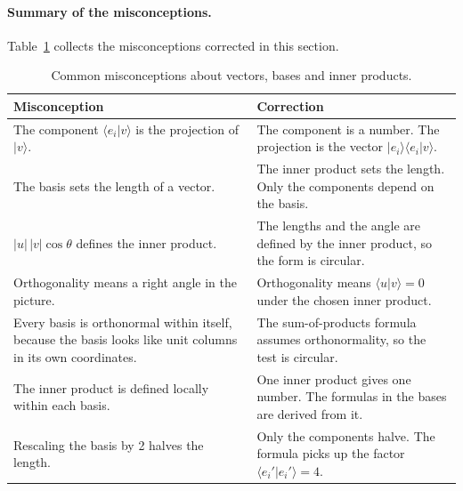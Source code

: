 \paragraph{Summary of the misconceptions.} Table~\ref{tab:misconceptions} collects the misconceptions corrected in this section.

\begin{table}[h]
    \centering
    \caption{Common misconceptions about vectors, bases and inner products.}
    \label{tab:misconceptions}
    \renewcommand{\arraystretch}{1.3}
    \begin{tabular}{p{}p{}}
        \toprule
        Misconception & Correction \\
        \midrule
        The component $\langle e_i | v \rangle$ is the projection of $|v\rangle$. & The component is a number. The projection is the vector $|e_i\rangle\langle e_i | v \rangle$. \\
        The basis sets the length of a vector. & The inner product sets the length. Only the components depend on the basis. \\
        $|u|\,|v|\cos\theta$ defines the inner product. & The lengths and the angle are defined by the inner product, so the form is circular. \\
        Orthogonality means a right angle in the picture. & Orthogonality means $\langle u | v \rangle = 0$ under the chosen inner product. \\
        Every basis is orthonormal within itself, because the basis looks like unit columns in its own coordinates. & The sum-of-products formula assumes orthonormality, so the test is circular. \\
        The inner product is defined locally within each basis. & One inner product gives one number. The formulas in the bases are derived from it. \\
        Rescaling the basis by 2 halves the length. & Only the components halve. The formula picks up the factor $\langle e_i' | e_i' \rangle = 4$. \\
        \bottomrule
    \end{tabular}
\end{table}
